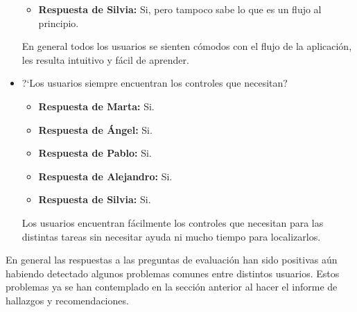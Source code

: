 \begin{itemize}
\begin{itemize}
              \item\textbf{Respuesta de Silvia:} Si, pero tampoco sabe lo que es un flujo al principio.
          \end{itemize}
          En general todos los usuarios se sienten cómodos con el flujo de la aplicación, les resulta intuitivo y fácil de aprender.
    \item ?`Los usuarios siempre encuentran los controles que necesitan?
          \begin{itemize}
              \item\textbf{Respuesta de Marta:} Si.
              \item \textbf{Respuesta de Ángel:} Si.
              \item\textbf{Respuesta de Pablo:} Si.
              \item\textbf{Respuesta de Alejandro:} Si.
              \item\textbf{Respuesta de Silvia:} Si.
          \end{itemize}
          Los usuarios encuentran fácilmente los controles que necesitan para las distintas tareas sin necesitar ayuda ni mucho tiempo para localizarlos.
\end{itemize}

En general las respuestas a las preguntas de evaluación han sido positivas aún habiendo detectado algunos problemas comunes entre distintos usuarios. Estos problemas ya se han contemplado en la sección anterior al hacer el informe de hallazgos y recomendaciones.